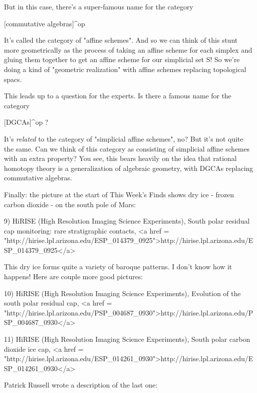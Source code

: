 But in this case, there's a super-famous name for the category

[commutative algebras]^{op}

It's called the category of "affine schemes".  And so we can think
of this stunt more geometrically as the process of taking an affine
scheme for each simplex and gluing them together to get an affine
scheme for our simplicial set S!   So we're doing a kind of "geometric
realization" with affine schemes replacing topological spacs.  

This leads up to a question for the experts.  Is there a famous name
for the category

[DGCAs]^{op} ?

It's \emph{related} to the category of "simplicial affine schemes",
no?  But it's not quite the same.  Can we think of this category as
consisting of simplicial affine schemes with an extra property?  You
see, this bears heavily on the idea that rational homotopy theory is a
generalization of algebraic geometry, with DGCAs replacing commutative
algebras.

Finally: the picture at the start of This Week's Finds shows dry ice -
frozen carbon dioxide - on the south pole of Mars:

9) HiRISE (High Resolution Imaging Science Experiments), 
South polar residual cap monitoring: rare stratigraphic contacts,
<a href = "http://hirise.lpl.arizona.edu/ESP_014379_0925">http://hirise.lpl.arizona.edu/ESP_014379_0925</a>

This dry ice forms quite a variety of baroque patterns.  I don't
know how it happens!  Here are couple more good pictures:

10) HiRISE (High Resolution Imaging Science Experiments), 
Evolution of the south polar residual cap,
<a href = "http://hirise.lpl.arizona.edu/PSP_004687_0930">http://hirise.lpl.arizona.edu/PSP_004687_0930</a>

11) HiRISE (High Resolution Imaging Science Experiments), 
South polar carbon dioxide ice cap,
<a href = "http://hirise.lpl.arizona.edu/ESP_014261_0930">http://hirise.lpl.arizona.edu/ESP_014261_0930</a>

Patrick Russell wrote a description of the last one:


